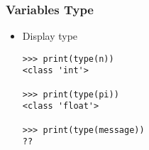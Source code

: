 \begin{frame}[fragile]\frametitle{Variables Type}
\begin{itemize}
\item Display type
\begin{lstlisting}
>>> print(type(n))
<class 'int'>

>>> print(type(pi))
<class 'float'>

>>> print(type(message))
??
\end{lstlisting}
\end{itemize}
\end{frame}







